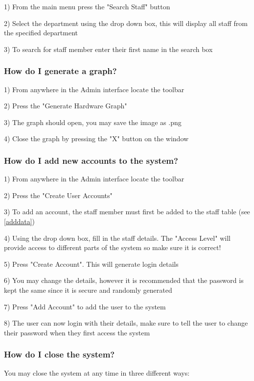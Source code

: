 1) From the main menu press the "Search Staff" button

2) Select the department using the drop down box, this will display all staff from the specified department

3) To search for staff member enter their first name in the search box

\subsubsection{How do I generate a graph?}

1) From anywhere in the Admin interface locate the toolbar

2) Press the "Generate Hardware Graph"

3) The graph should open, you may save the image as .png

4) Close the graph by pressing the "X" button on the window

\subsubsection{How do I add new accounts to the system?}

1) From anywhere in the Admin interface locate the toolbar

2) Press the "Create User Accounts"

3) To add an account, the staff member must first be added to the staff table (see \ref{adddata})

4) Using the drop down box, fill in the staff details. The "Access Level" will provide access to different parts of the system so make sure it is correct! 

5) Press "Create Account". This will generate login details

6) You may change the details, however it is recommended that the password is kept the same since it is secure and randomly generated

7) Press "Add Account" to add the user to the system

8) The user can now login with their details, make sure to tell the user to change their password when they first access the system

\subsubsection{How do I close the system?}

You may close the system at any time in three different ways:

